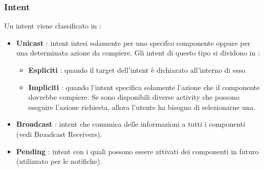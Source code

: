 \documentclass[12pt]{report}
\begin{document}
\subsubsection{Intent}
Un intent viene classificato in :
\begin{itemize}
\item \textbf{Unicast} : intent intesi solamente per uno specifco componente oppure per una determinata azione da compiere. Gli intent di questo tipo si dividono in :
\begin{itemize}
\item \textbf{Espliciti} : quando il target dell'intent è dichiarato all'interno di esso.
\item \textbf{Impliciti} : quando l'intent specifica solamente l'azione che il componente dovrebbe compiere. Se sono disponibili diverse activity che possono eseguire l'azione richiesta, allora l'utente ha bisogno di selezionarne una.
\end{itemize}
\item \textbf{Broadcast} : intent che comunica delle informazioni a tutti i componenti (vedi Broadcast Receivers).
\item \textbf{Pending} : intent con i quali possono essere attivati dei componenti in futuro (utilizzato per le notifiche).
\end{itemize}
\end{document}
